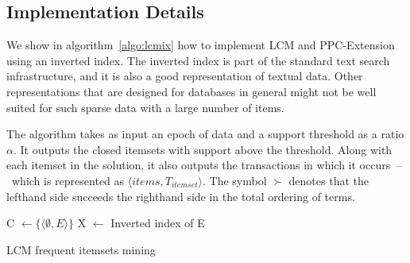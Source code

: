 \documentclass{sig-alternate}
\begin{document}
\subsection{Implementation Details}
We show in algorithm~\ref{algo:lcmix} how to implement LCM and PPC-Extension
using an inverted index.
The inverted index is part of the standard text search infrastructure,
and it is also a  good representation of textual data. 
Other representations that are designed for databases in general
might not be well suited for such sparse data with a large number of items. %

The algorithm takes as input an epoch of data and a support threshold as a
ratio $\alpha$.
It outputs the closed itemsets with support above the threshold.
Along with each itemset in the solution, it also outputs the transactions
in which it occurs~--~which is represented as $\langle items,
T_{itemset} \rangle$.
The symbol $\succ$ denotes that the lefthand side  succeeds the righthand
side in the total ordering of terms. 

\begin{algorithm}
\SetAlgoLined
\LinesNumbered
{}

C $\gets \{\langle \emptyset, E\rangle\}$ 
X $\gets$ Inverted index of E\;
\;


\caption{LCM frequent itemsets mining}
\label{algo:lcmix}
\end{algorithm}
\end{document}
